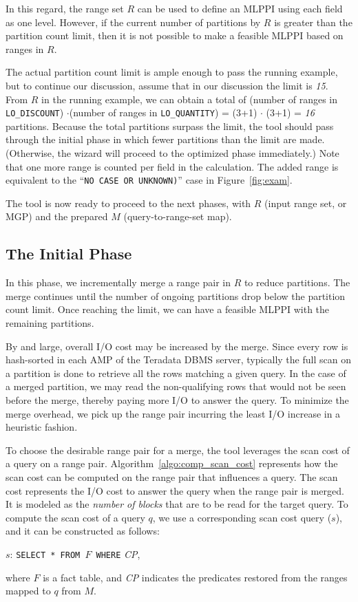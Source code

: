 \documentclass[runningheads]{comsis2}
\begin{document}
In this regard, the range set $R$ can be used to define an MLPPI using each field as one level. 
However, if the current number of partitions by $R$ is greater than 
the partition count limit, 
then it is not possible to make a feasible MLPPI based on ranges in $R$. 

The actual partition count limit is ample enough to pass the running example, 
but to continue our discussion, assume that in our discussion the limit is {\it 15}.
From $R$ in the running example, we can obtain a total of (number of ranges in {\tt LO\_DISCOUNT}) 
$\cdot$(number of ranges in {\tt LO\_QUANTITY}) = (3+1) $\cdot$ (3+1) = {\it 16}
partitions. 
Because the total partitions surpass the limit, 
the tool should pass through the initial phase in which 
fewer partitions than the limit are made. 
(Otherwise, the wizard will proceed to the optimized phase immediately.) 
Note that one more range is counted per field in the calculation. 
The added range is equivalent to the ``{\tt NO CASE OR UNKNOWN)}'' case in Figure~\ref{fig:exam}. 

The tool is now ready to proceed to the next phases, 
with $R$ (input range set, or MGP) and the prepared $M$ (query-to-range-set map). 

\subsection{The Initial Phase}
\label{sec:init_phase}

In this phase, we incrementally merge a range pair in $R$ to reduce partitions. 
The merge continues until the number of ongoing partitions 
drop below the partition count limit. 
Once reaching the limit, we can have a feasible MLPPI with 
the remaining partitions. 

By and large, overall I/O cost may be increased by the merge. 
Since every row is hash-sorted in each AMP of the Teradata DBMS server, 
typically the full scan on a partition is done to retrieve 
all the rows matching a given query. 
In the case of a merged partition, we may read the non-qualifying rows 
that would not be seen before the merge, thereby paying more I/O to answer 
the query.  
To minimize the merge overhead, we pick up the range pair incurring 
the least I/O increase in a heuristic fashion.

To choose the desirable range pair for a merge, 
the tool leverages the scan cost of a query on a range pair.
Algorithm~\ref{algo:comp_scan_cost} represents how 
the scan cost can be computed on the range pair that \hbox{influences} a query. 
The scan cost represents the I/O cost to answer the query when the range pair is merged. It is 
modeled as the {\em number of blocks} that are to be read 
for the target query. To compute the scan cost of a query $q$, we use 
a corresponding scan cost query ($s$), and 
it can be constructed as follows: 
\begin{center}
$s$: {\tt SELECT * FROM $F$ WHERE} {\it CP},
\end{center} 
where $F$ is a fact table, and 
{\it CP} indicates the predicates  
restored from the ranges mapped to $q$ from $M$.
\end{document}

